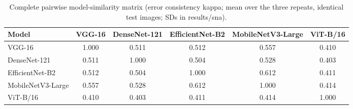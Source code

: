 \begin{table}[!tbp]
\centering
\caption{Complete pairwise model-similarity matrix (error consistency kappa; mean over the three repeats, identical test images; SDs in results/sna).}
\label{tab:sim_error_consistency_kappa}
\footnotesize
\begin{tabular}{lccccc}
\hline
Model & VGG-16 & DenseNet-121 & EfficientNet-B2 & MobileNetV3-Large & ViT-B/16 \\
\hline
VGG-16 & 1.000 & 0.511 & 0.512 & 0.557 & 0.410 \\
DenseNet-121 & 0.511 & 1.000 & 0.504 & 0.528 & 0.403 \\
EfficientNet-B2 & 0.512 & 0.504 & 1.000 & 0.612 & 0.411 \\
MobileNetV3-Large & 0.557 & 0.528 & 0.612 & 1.000 & 0.414 \\
ViT-B/16 & 0.410 & 0.403 & 0.411 & 0.414 & 1.000 \\
\hline
\end{tabular}
\end{table}